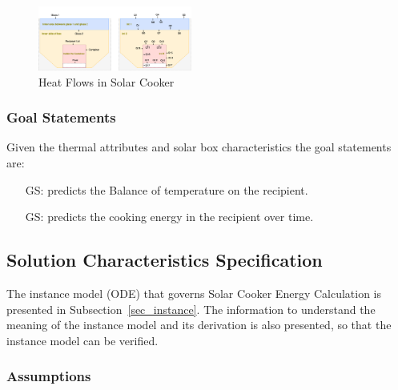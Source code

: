 \documentclass[12pt]{article}
\newcounter{goalnum} %
\begin{document}
\begin{figure}[h!]
\begin{center}
\includegraphics[width=0.45\textwidth]{HeatFlow}
\caption{Heat Flows in Solar Cooker}
\label{Fig_HeatFlows} 
\end{center}
\end{figure}



\subsubsection{Goal Statements}

\noindent Given the thermal attributes and solar box characteristics the goal statements are:

\begin{itemize}

\item[GS\refstepcounter{goalnum}\thegoalnum \label{G_meaningfulLabel}:] predicts the Balance of temperature on the recipient.

\item[GS\refstepcounter{goalnum}\thegoalnum \label{G_meaningfulLabel}:] predicts the cooking energy in the recipient over time.

\end{itemize}

\subsection{Solution Characteristics Specification}

The instance model (ODE) that governs Solar Cooker
Energy Calculation is presented in
Subsection~\ref{sec_instance}.  The information to understand the meaning of the
instance model and its derivation is also presented, so that the instance
model can be verified.

\subsubsection{Assumptions} \label{sec_assumpt}
\end{document}
